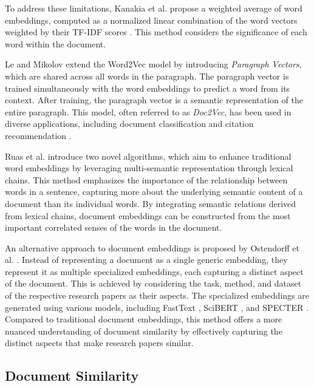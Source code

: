 To address these limitations, Kanakia et al. \cite{KanakiaScalableHybrid2019} propose a weighted average of word embeddings, computed as a normalized linear combination of the word vectors weighted by their TF-IDF scores \cite{SaltonTermWeighting1987}.
This method considers the significance of each word within the document.

Le and Mikolov \cite{LeDistributedRepresentations2014} extend the Word2Vec model by introducing \emph{Paragraph Vectors}, which are shared across all words in the paragraph. The paragraph vector is trained simultaneously with the word embeddings to predict a word from its context. After training, the paragraph vector is a semantic representation of the entire paragraph.
This model, often referred to as \emph{Doc2Vec}, has been used in diverse applications, including document classification \cite{OstendorffPairwiseMultiClass2020} and citation recommendation \cite{FarberHybridCiteHybrid2020,BhagavatulaContentBasedCitation2018}.

Ruas et al. \cite{RuasEnhancedWord2020} introduce two novel algorithms, which aim to enhance traditional word embeddings by leveraging multi-semantic representation through lexical chains. This method emphasizes the importance of the relationship between words in a sentence, capturing more about the underlying semantic content of a document than its individual words. By integrating semantic relations derived from lexical chains, document embeddings can be constructed from the most important correlated senses of the words in the document.

An alternative approach to document embeddings is proposed by Ostendorff et al. \cite{OstendorffSpecializedDocument2022}. Instead of representing a document as a single generic embedding, they represent it as multiple specialized embeddings, each capturing a distinct aspect of the document. This is achieved by considering the task, method, and dataset of the respective research papers as their aspects. The specialized embeddings are generated using various models, including FastText \cite{BojanowskiEnrichingWord2017}, SciBERT \cite{BeltagySciBERTPretrained2019}, and SPECTER \cite{CohanSPECTERDocumentlevel2020}.
Compared to traditional document embeddings, this method offers a more nuanced understanding of document similarity by effectively capturing the distinct aspects that make research papers similar.


\subsection{Document Similarity}

